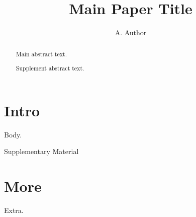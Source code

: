 \documentclass{article}
\title{Main Paper Title}\author{A. Author}
\begin{document}
\maketitle
\begin{abstract}Main abstract text.\end{abstract}
\section{Intro} Body.
\clearpage
\begin{center}\Large Supplementary Material\end{center}
\begin{abstract}Supplement abstract text.\end{abstract}
\section{More} Extra.
\end{document}
